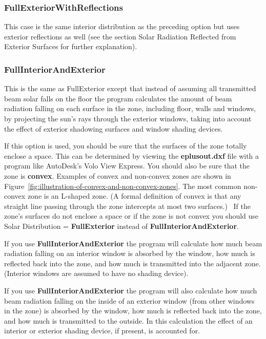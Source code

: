 \subsubsection{FullExteriorWithReflections}\label{fullexteriorwithreflections}

This case is the same interior distribution as the preceding option but uses exterior reflections as well (see the section Solar Radiation Reflected from Exterior Surfaces for further explanation).

\subsubsection{FullInteriorAndExterior}\label{fullinteriorandexterior}

This is the same as FullExterior except that instead of assuming all transmitted beam solar falls on the floor the program calculates the amount of beam radiation falling on each surface in the zone, including floor, walls and windows, by projecting the sun's rays through the exterior windows, taking into account the effect of exterior shadowing surfaces and window shading devices.

If this option is used, you should be sure that the surfaces of the zone totally enclose a space. This can be determined by viewing the \textbf{eplusout.dxf} file with a program like AutoDesk's Volo View Express. You should also be sure that the zone is \textbf{convex}. Examples of convex and non-convex zones are shown in Figure~\ref{fig:illustration-of-convex-and-non-convex-zones}. The most common non-convex zone is an L-shaped zone. (A formal definition of convex is that any straight line passing through the zone intercepts at most two surfaces.)~ If the zone's surfaces do not enclose a space or if the zone is not convex you should use Solar Distribution = \textbf{FullExterior} instead of \textbf{FullInteriorAndExterior}.

If you use \textbf{FullInteriorAndExterior} the program will calculate how much beam radiation falling on an interior window is absorbed by the window, how much is reflected back into the zone, and how much is transmitted into the adjacent zone. (Interior windows are assumed to have no shading device).

If you use \textbf{FullInteriorAndExterior} the program will also calculate how much beam radiation falling on the inside of an exterior window (from other windows in the zone) is absorbed by the window, how much is reflected back into the zone, and how much is transmitted to the outside. In this calculation the effect of an interior or exterior shading device, if present, is accounted for.

